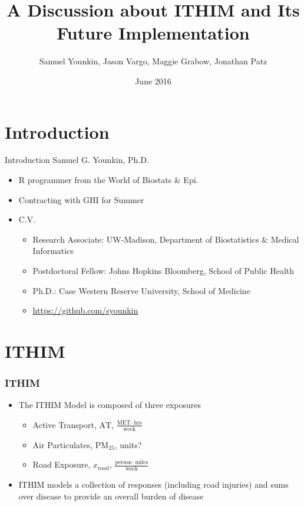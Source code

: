 \documentclass[handout,13pt,compress,c]{beamer}
\title[ITHIM]{A Discussion about ITHIM and Its Future Implementation}
\author[Younkin et al.]{\small{Samuel Younkin, Jason Vargo, Maggie Grabow, Jonathan Patz}}
\institute{Global Health Institute\\University of Wisconsin-Madison}
\date{\tiny{June 2016}}
\newcommand{\ft}[1]{\frametitle{#1}}
\newcommand{\bi}{\begin{itemize}}
\newcommand{\ei}{\end{itemize}}
\begin{document}
\frame{\titlepage}
\frame{
   \ft{Outline}
\tableofcontents
}
\section{Introduction}
\begin{frame}{Introduction}
Samuel G. Younkin, Ph.D.
\bi\item R programmer from the World of Biostats \& Epi.
\item Contracting with GHI for Summer
\item C.V.
\bi \item Research Associate: UW-Madison, Department of Biostatistics
\& Medical Informatics
\item Postdoctoral Fellow: Johns Hopkins Bloomberg, School of Public Health
\item Ph.D.: Case Western Reserve University, School of Medicine
\item \url{https://github.com/syounkin}
\ei\ei
\end{frame}
\section{ITHIM}
\begin{frame}[fragile]
\frametitle{ITHIM}
\bi \item The ITHIM Model is composed of three exposures
\bi \item Active Transport, $\mathrm{AT}$, $\frac{\mathrm{MET}\cdot\mathrm{hrs}}{\mathrm{week}}$
\item Air Particulates, $\mathrm{PM}_{25}$, units?
\item Road Exposure, $x_\mathrm{road}$, $\frac{\mathrm{person}\cdot\mathrm{miles}}{\mathrm{week}}$
\ei
\item ITHIM models a collection of responses (including road injuries)
  and sums over disease to provide an overall burden of
  disease
\ei
\end{frame}
\end{document}
